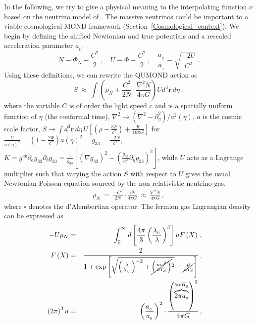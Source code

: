 \documentclass[fleqn,usenatbib,useAMS,onecolumn]{mnras} %
\begin{document}

In the following, we try to give a physical meaning to the interpolating function $\nu$ based on the neutrino model of \citet{Zhao_2008_neutrinos}. The massive neutrinos could be important to a viable cosmological MOND framework (Section~\ref{Cosmological_context}). We begin by defining the shifted Newtonian and true potentials and a rescaled acceleration parameter $a_{_U}$.
\begin{equation}
    N \equiv \Phi_N - \frac{C^2}{2} \, , \quad U \equiv \Phi - \frac{C^2}{2} \, , \quad \frac{a_{_U}}{a_{_0}} \equiv \sqrt{\frac{-2U}{C^2}} \, .
\end{equation}
Using these definitions, we can rewrite the QUMOND action as
\begin{equation}
    S ~\approx~ \int \left(\rho_{N} + \frac{C^2}{2N} \cdot \frac{\nabla^2 N}{4\mathrm{\pi}G} \right) U d^3 \bm{r} \, d\eta \, ,   \label{actionnonrel}
\end{equation}
where the variable $C$ is of order the light speed $c$ and is a spatially uniform function of $\eta$ (the conformal time), $\nabla^2 \rightarrow \left( \nabla^2 - \partial^2_\eta \right)/ a^2 \left( \eta \right)$, $a$ is the cosmic scale factor, $S \rightarrow \int  d^3\bm{r} \, d\eta \, U \left[ \left( \rho -\frac{3P}{c^2} \right) + \frac{K}{16\mathrm{\pi} G} \right]$ for $\frac{U}{a \left( \eta \right)^2} = \left( 1 - \frac{2\Phi}{c^2} \right) a\left( \eta \right)^2=g_{33} = \frac{-2 N}{c^2}$, $K=g^{ab} \partial_a g_{33} \partial_b g_{33} = \frac{1}{g_{33}} \left[\left(\nabla g_{33}\right)^2  -\left(\frac{g_{33}}{a^2}\partial_\eta g_{33}\right)^2 \right]$, while $U$ acts as a Lagrange multiplier such that varying the action $S$ with respect to $U$ gives the usual Newtonian Poisson equation sourced by the non-relativistic neutrino gas.
\begin{eqnarray}
    \rho_{N} ~=~ \frac{-C^2}{2N} \cdot \frac{\square N}{4\mathrm{\pi}G} ~\approx~ \frac{\nabla^2 N}{4 \mathrm{\pi}G} \, ,
    \label{Poiss}
\end{eqnarray}
where $\square$ denotes the d'Alembertian operator. The fermion gas Lagrangian density can be expressed as
\begin{eqnarray}
    \label{Energy_density_neutrinos}
    \!\!\!\!\!\!\! -U\rho_{N} &=& \int^\infty_0 d\left[\frac{  4 \mathrm{\pi}}{3}  \left(\frac{\lambda_{_U}}{\lambda}\right)^3 \right] u F\left( X \right) \, , \\
    \!\!\!\!\!\!\! F\left( X \right) &=& \frac{2}{1 + \exp\left[\sqrt{\left( \frac{\lambda}{\lambda_{_U}} \right)^{-2} + \cancel{\left(\frac{mc^2}{kT_d}\right)}^2} - \cancel{\frac{\mu}{kT_d}} \right]} \, , \\
    \!\!\!\!\!\!\! \left( 2\mathrm{\pi} \right)^3 u &=& \left( \frac{a_{_U}}{a_{_0}} \right)^2 \cdot \frac{\left(\overbrace{2 \mathrm{\pi} a_{_0}}^{\approx c H_{_0}}\right)^2}{4\mathrm{\pi} G} \, ,
\end{eqnarray}
\end{document}
